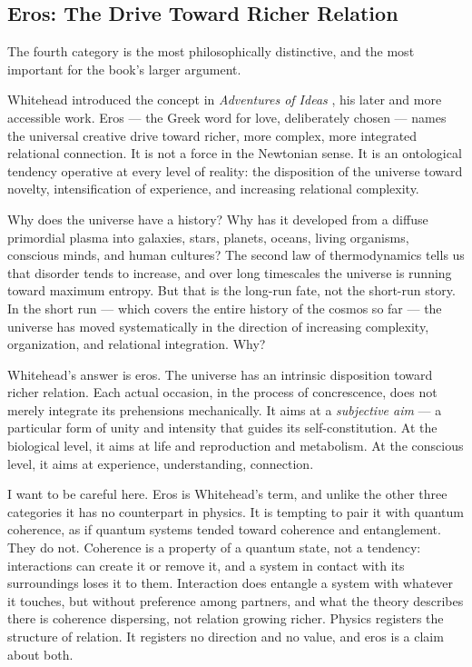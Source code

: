 \subsection*{Eros: The Drive Toward Richer Relation}

The fourth category is the most philosophically distinctive, and the most important for the book's larger argument.

Whitehead introduced the concept in \textit{Adventures of Ideas} \citep{Whitehead1933}, his later and more accessible work. Eros --- the Greek word for love, deliberately chosen --- names the universal creative drive toward richer, more complex, more integrated relational connection. It is not a force in the Newtonian sense. It is an ontological tendency operative at every level of reality: the disposition of the universe toward novelty, intensification of experience, and increasing relational complexity.

Why does the universe have a history? Why has it developed from a diffuse primordial plasma into galaxies, stars, planets, oceans, living organisms, conscious minds, and human cultures? The second law of thermodynamics tells us that disorder tends to increase, and over long timescales the universe is running toward maximum entropy. But that is the long-run fate, not the short-run story. In the short run --- which covers the entire history of the cosmos so far --- the universe has moved systematically in the direction of increasing complexity, organization, and relational integration. Why?

Whitehead's answer is eros. The universe has an intrinsic disposition toward richer relation. Each actual occasion, in the process of concrescence, does not merely integrate its prehensions mechanically. It aims at a \emph{subjective aim} --- a particular form of unity and intensity that guides its self-constitution. At the biological level, it aims at life and reproduction and metabolism. At the conscious level, it aims at experience, understanding, connection.

I want to be careful here. Eros is Whitehead's term, and unlike the other three categories it has no counterpart in physics. It is tempting to pair it with quantum coherence, as if quantum systems tended toward coherence and entanglement. They do not. Coherence is a property of a quantum state, not a tendency: interactions can create it or remove it, and a system in contact with its surroundings loses it to them. Interaction does entangle a system with whatever it touches, but without preference among partners, and what the theory describes there is coherence dispersing, not relation growing richer. Physics registers the structure of relation. It registers no direction and no value, and eros is a claim about both.

